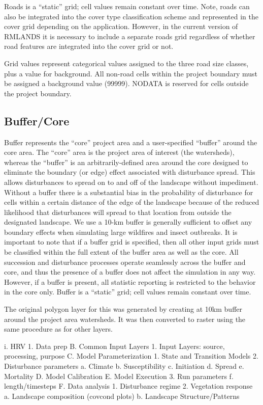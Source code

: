 Roads is a “static” grid; cell values remain constant over time. Note, roads can also be integrated into the cover type classification scheme and represented in the cover grid depending on the application. However, in the current version of RMLANDS it is necessary to include a separate roads grid regardless of whether road features are integrated into the cover grid or not.

Grid values represent categorical values assigned to the three road size classes, plus a value for background. All non-road cells within the project boundary must be assigned a background value (99999). NODATA is reserved for cells outside the project boundary.

\subsection{Buffer/Core} 
Buffer represents the ``core'' project area and a user-specified ``buffer'' around the core area. The ``core'' area is the project area of interest (the watersheds), whereas the ``buffer'' is an arbitrarily-defined area around the core designed to eliminate the boundary (or edge) effect associated with disturbance spread. This allows disturbances to spread on to and off of the landscape without impediment. Without a buffer there is a substantial bias in the probability of disturbance for cells within a certain distance of the edge of the landscape because of the reduced likelihood that disturbances will spread to that location from outside the designated landscape. We use a 10-km buffer is generally sufficient to offset any boundary effects when simulating large wildfires and insect outbreaks. It is important to note that if a buffer grid is specified, then all other input grids must be classified within the full extent of the buffer area as well as the core. All succession and disturbance processes operate seamlessly across the buffer and core, and thus the presence of a buffer does not affect the simulation in any way. However, if a buffer is present, all statistic reporting is restricted to the behavior in the core only. Buffer is a ``static'' grid; cell values remain constant over time.

The original polygon layer for this was generated by creating at 10km buffer around the project area watersheds. It was then converted to raster using the same procedure as for other layers. 

	i. HRV
		1. Data prep
			B. Common Input Layers
				1. Input Layers: source, processing, purpose
		C. Model Parameterization
				1. State and Transition Models
				2. Disturbance parameters
					a. Climate
					b. Susceptibility
					c. Initiation
					d. Spread
					e. Mortality
		D. Model Calibration
		E. Model Execution
			3. Run parameters
				f. length/timesteps
		F. Data analysis
			1. Disturbance regime
			2. Vegetation response 
				a. Landscape composition (covcond plots)
				b. Landscape Structure/Patterns







